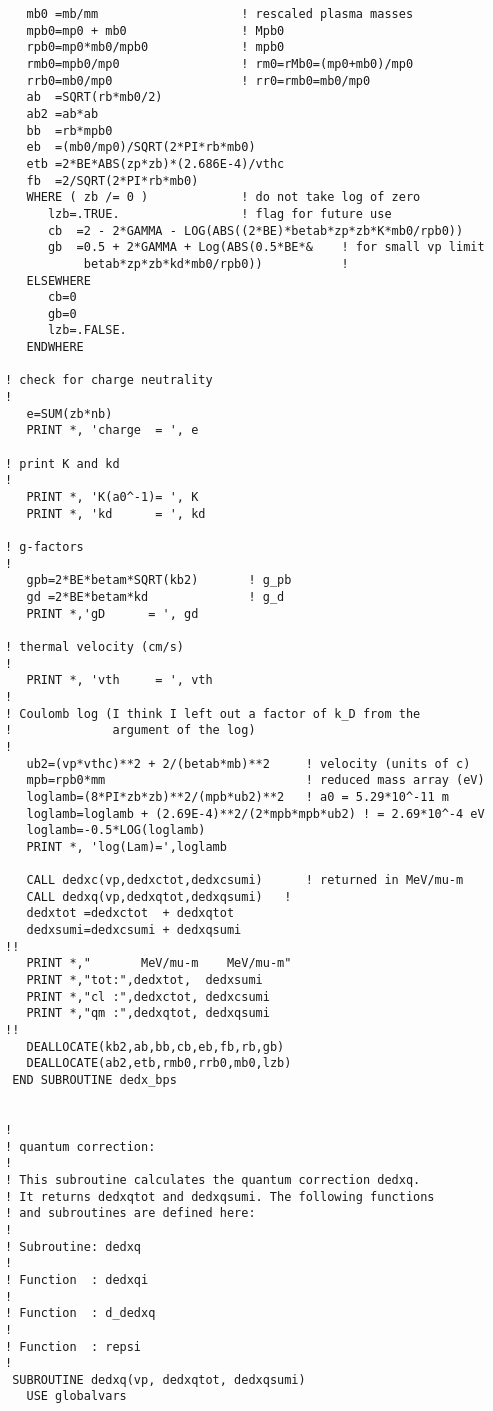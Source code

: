 \documentclass[preprint,12pt,eqsecnum,nofootinbib,amsmath,amssymb]{revtex4}
\begin{document}
{\begin{verbatim}
   mb0 =mb/mm                    ! rescaled plasma masses
   mpb0=mp0 + mb0                ! Mpb0
   rpb0=mp0*mb0/mpb0             ! mpb0
   rmb0=mpb0/mp0                 ! rm0=rMb0=(mp0+mb0)/mp0
   rrb0=mb0/mp0                  ! rr0=rmb0=mb0/mp0
   ab  =SQRT(rb*mb0/2)            
   ab2 =ab*ab                    
   bb  =rb*mpb0                   
   eb  =(mb0/mp0)/SQRT(2*PI*rb*mb0)
   etb =2*BE*ABS(zp*zb)*(2.686E-4)/vthc
   fb  =2/SQRT(2*PI*rb*mb0)
   WHERE ( zb /= 0 )             ! do not take log of zero
      lzb=.TRUE.                 ! flag for future use
      cb  =2 - 2*GAMMA - LOG(ABS((2*BE)*betab*zp*zb*K*mb0/rpb0))
      gb  =0.5 + 2*GAMMA + Log(ABS(0.5*BE*&    ! for small vp limit
           betab*zp*zb*kd*mb0/rpb0))           !
   ELSEWHERE
      cb=0
      gb=0
      lzb=.FALSE.
   ENDWHERE

! check for charge neutrality
!
   e=SUM(zb*nb)
   PRINT *, 'charge  = ', e

! print K and kd
! 
   PRINT *, 'K(a0^-1)= ', K
   PRINT *, 'kd      = ', kd

! g-factors
!
   gpb=2*BE*betam*SQRT(kb2)       ! g_pb 
   gd =2*BE*betam*kd              ! g_d
   PRINT *,'gD      = ', gd

! thermal velocity (cm/s)
!
   PRINT *, 'vth     = ', vth
!
! Coulomb log (I think I left out a factor of k_D from the 
!              argument of the log)
!
   ub2=(vp*vthc)**2 + 2/(betab*mb)**2     ! velocity (units of c)
   mpb=rpb0*mm                            ! reduced mass array (eV)
   loglamb=(8*PI*zb*zb)**2/(mpb*ub2)**2   ! a0 = 5.29*10^-11 m 
   loglamb=loglamb + (2.69E-4)**2/(2*mpb*mpb*ub2) ! = 2.69*10^-4 eV
   loglamb=-0.5*LOG(loglamb)
   PRINT *, 'log(Lam)=',loglamb

   CALL dedxc(vp,dedxctot,dedxcsumi)      ! returned in MeV/mu-m
   CALL dedxq(vp,dedxqtot,dedxqsumi)   !
   dedxtot =dedxctot  + dedxqtot
   dedxsumi=dedxcsumi + dedxqsumi
!!
   PRINT *,"       MeV/mu-m    MeV/mu-m"
   PRINT *,"tot:",dedxtot,  dedxsumi
   PRINT *,"cl :",dedxctot, dedxcsumi
   PRINT *,"qm :",dedxqtot, dedxqsumi
!!
   DEALLOCATE(kb2,ab,bb,cb,eb,fb,rb,gb)
   DEALLOCATE(ab2,etb,rmb0,rrb0,mb0,lzb)
 END SUBROUTINE dedx_bps


!
! quantum correction:
!
! This subroutine calculates the quantum correction dedxq.
! It returns dedxqtot and dedxqsumi. The following functions 
! and subroutines are defined here:
!
! Subroutine: dedxq
!
! Function  : dedxqi
!
! Function  : d_dedxq 
!
! Function  : repsi
!
 SUBROUTINE dedxq(vp, dedxqtot, dedxqsumi)
   USE globalvars
   

\end{verbatim}}
\end{document}
